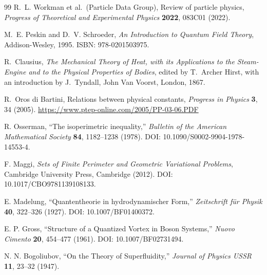 \documentclass[aps,pra,preprint,longbibliography,nofootinbib]{revtex4-2}
\begin{document}
\begin{thebibliography}{99}
R.~L. Workman et al.\ (Particle Data Group),
Review of particle physics,
\textit{Progress of Theoretical and Experimental Physics}
\textbf{2022}, 083C01 (2022).

M.~E. Peskin and D.~V. Schroeder,
\textit{An Introduction to Quantum Field Theory},
Addison-Wesley, 1995.
ISBN: 978-0201503975.

R.~Clausius,
\textit{The Mechanical Theory of Heat, with its Applications to the
Steam-Engine and to the Physical Properties of Bodies},
edited by T.~Archer Hirst, with an introduction by J.~Tyndall,
John Van Voorst, London, 1867.

R.~Oros di Bartini,
Relations between physical constants,
\textit{Progress in Physics} \textbf{3}, 34 (2005).
\url{https://www.ptep-online.com/2005/PP-03-06.PDF}

R. Osserman,
``The isoperimetric inequality,''
\emph{Bulletin of the American Mathematical Society} \textbf{84},
1182--1238 (1978).
DOI: 10.1090/S0002-9904-1978-14553-4.

F. Maggi,
\emph{Sets of Finite Perimeter and Geometric Variational Problems},
Cambridge University Press, Cambridge (2012).
DOI: 10.1017/CBO9781139108133.

E. Madelung,
``Quantentheorie in hydrodynamischer Form,''
\emph{Zeitschrift f\"ur Physik} \textbf{40}, 322--326 (1927).
DOI: 10.1007/BF01400372.

E. P. Gross,
``Structure of a Quantized Vortex in Boson Systems,''
\emph{Nuovo Cimento} \textbf{20}, 454--477 (1961).
DOI: 10.1007/BF02731494.

N. N. Bogoliubov,
``On the Theory of Superfluidity,''
\emph{Journal of Physics USSR} \textbf{11}, 23--32 (1947).

\end{thebibliography}
\end{document}
